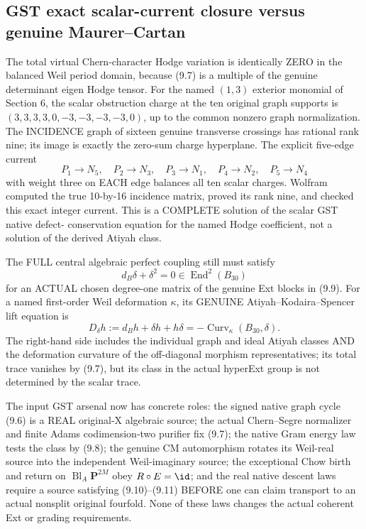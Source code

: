 \documentclass[11pt,a4paper]{article}
\begin{document}
\subsection*{GST exact scalar-current closure versus genuine Maurer--Cartan}
The total virtual
Chern-character
Hodge variation is
identically ZERO in
the balanced Weil
period domain,
because (9.7) is
a multiple of the
genuine determinant
eigen Hodge tensor.
For the named
\((1,3)\) exterior
monomial of Section 6,
the scalar
obstruction charge
at the ten original
graph supports is
\( (3,3,3,3,0,
   -3,-3,-3,-3,0)\),
up to the common
nonzero graph
normalization.
The INCIDENCE graph
of sixteen genuine
transverse crossings
has rational rank
nine; its image
is exactly the
zero-sum charge
hyperplane.
The explicit
five-edge current
\[
 \boxed{
 P_1\to N_5,\quad
 P_2\to N_3,\quad
 P_3\to N_1,\quad
 P_4\to N_2,\quad
 P_5\to N_4
 }
\]
with weight three
on EACH edge
balances all ten
scalar charges.
Wolfram computed
the true 10-by-16
incidence matrix,
proved its rank
nine, and checked
this exact integer
current. This is
a COMPLETE solution
of the scalar GST
native defect-
conservation equation
for the named
Hodge coefficient,
not a solution
of the derived
Atiyah class.

The FULL central
algebraic perfect
coupling still must
satisfy
\[
 \boxed{
 d_B\delta+\delta^2=0
       \in \operatorname{End}^2(B_{30})
 }                                                       \tag{9.10}
\]
for an ACTUAL chosen
degree-one matrix
of the genuine
Ext blocks in (9.9).
For a named
first-order Weil
deformation \(\kappa\),
its GENUINE
Atiyah--Kodaira--Spencer
lift equation is
\[
 \boxed{
 D_\delta h
   :=d_Bh+\delta h+h\delta
   =-\operatorname{Curv}_\kappa(B_{30},\delta).
 }                                                       \tag{9.11}
\]
The right-hand side
includes the
individual graph
and ideal Atiyah
classes AND
the deformation
curvature of the
off-diagonal
morphism representatives;
its total trace
vanishes by (9.7),
but its class
in the actual
hyperExt group is
not determined by
the scalar trace.

The input GST arsenal
now has concrete
roles: the signed
native graph cycle
(9.6) is a REAL
original-X algebraic
source; the
actual Chern--Segre
normalizer and finite
Adams codimension-two
purifier fix (9.7);
the native Gram
energy law tests
the class by (9.8);
the genuine CM
automorphism rotates
its Weil-real
source into the
independent Weil-imaginary
source; the
exceptional Chow
birth and return
on \(\operatorname{Bl}_A
\mathbf P^{2M}\)
obey \(R\circ E=\id\);
and the real native
descent laws require
a source satisfying
(9.10)--(9.11)
BEFORE one can claim
transport to an
actual nonsplit
original fourfold.
None of these
laws changes the
actual coherent
Ext or grading
requirements.
\end{document}
